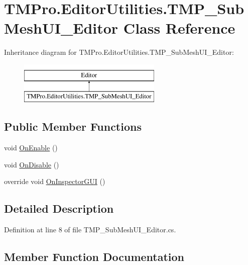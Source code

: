 \hypertarget{class_t_m_pro_1_1_editor_utilities_1_1_t_m_p___sub_mesh_u_i___editor}{}\section{T\+M\+Pro.\+Editor\+Utilities.\+T\+M\+P\+\_\+\+Sub\+Mesh\+U\+I\+\_\+\+Editor Class Reference}
\label{class_t_m_pro_1_1_editor_utilities_1_1_t_m_p___sub_mesh_u_i___editor}
Inheritance diagram for T\+M\+Pro.\+Editor\+Utilities.\+T\+M\+P\+\_\+\+Sub\+Mesh\+U\+I\+\_\+\+Editor\+:\begin{figure}[H]
\begin{center}
\leavevmode
\includegraphics[height=2.000000cm]{class_t_m_pro_1_1_editor_utilities_1_1_t_m_p___sub_mesh_u_i___editor}
\end{center}
\end{figure}
\subsection*{Public Member Functions}
\begin{DoxyCompactItemize}
\item 
void \mbox{\hyperlink{class_t_m_pro_1_1_editor_utilities_1_1_t_m_p___sub_mesh_u_i___editor_ac7be378cdc471d5b7b2a455fce25f358}{On\+Enable}} ()
\item 
void \mbox{\hyperlink{class_t_m_pro_1_1_editor_utilities_1_1_t_m_p___sub_mesh_u_i___editor_a50d02affa7fbd9ff08426629786615ce}{On\+Disable}} ()
\item 
override void \mbox{\hyperlink{class_t_m_pro_1_1_editor_utilities_1_1_t_m_p___sub_mesh_u_i___editor_af9405c765094607ca214e34a83718e1f}{On\+Inspector\+G\+UI}} ()
\end{DoxyCompactItemize}


\subsection{Detailed Description}


Definition at line 8 of file T\+M\+P\+\_\+\+Sub\+Mesh\+U\+I\+\_\+\+Editor.\+cs.



\subsection{Member Function Documentation}
\mbox{\label{class_t_m_pro_1_1_editor_utilities_1_1_t_m_p___sub_mesh_u_i___editor_a50d02affa7fbd9ff08426629786615ce}} 
